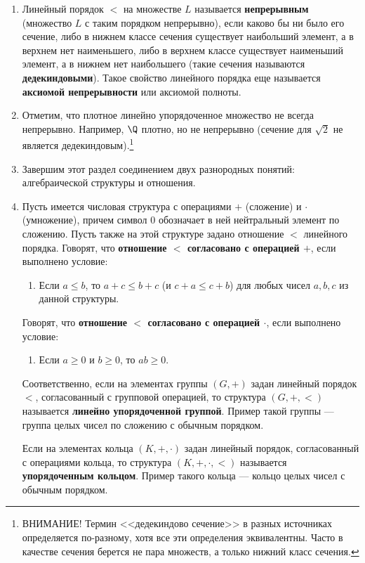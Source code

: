 \begin{enumerate}
\item Линейный порядок $<$ на множестве $L$ называется \textbf{непрерывным} (множество $L$ с таким порядком непрерывно), если каково бы ни было его сечение, либо в нижнем классе сечения существует наибольший элемент, а в верхнем нет наименьшего, либо в верхнем классе существует наименьший элемент, а в нижнем нет наибольшего (такие сечения называются \textbf{дедекиндовыми}). Такое свойство линейного порядка еще называется \textbf{аксиомой непрерывности} или аксиомой полноты.

\item Отметим, что плотное линейно упорядоченное множество не всегда непрерывно. Например, $\Q$ плотно, но не непрерывно (сечение для $\sqrt 2$ не является дедекиндовым).\footnote{ВНИМАНИЕ! Термин <<дедекиндово сечение>> в разных источниках определяется по-разному, хотя все эти определения эквивалентны. Часто в качестве сечения берется не пара множеств, а только нижний класс сечения.}

\item Завершим этот раздел соединением двух разнородных понятий: алгебраической структуры и отношения.
\item Пусть имеется числовая структура с операциями $+$ (сложение) и $\cdot$ (умножение), причем символ 0 обозначает в ней нейтральный элемент по сложению. Пусть также на этой структуре задано отношение $<$ линейного порядка. Говорят, что \textbf{отношение $<$ согласовано с операцией $+$}, если выполнено условие:
\begin{enumerate}[resume*]
\item Если $a\le b$, то $a+c\le b+c$ (и $c+a\le c+b$) для любых чисел $a,b,c$ из данной структуры.
\end{enumerate}
Говорят, что \textbf{отношение $<$ согласовано с операцией $\cdot$}, если выполнено условие:
\begin{enumerate}[resume*]
\item Если $a\ge 0$ и $b\ge 0$, то $ab\ge 0$.
\end{enumerate}

Соответственно, если на элементах группы $(G,+)$ задан линейный порядок $<$, согласованный с групповой операцией, то структура $(G,+,<)$ называется \textbf{линейно упорядоченной группой}. Пример такой группы --- группа целых чисел по сложению с обычным порядком.

Если на элементах кольца $(K,+,\cdot)$ задан линейный порядок, согласованный с операциями кольца, то структура $(K,+,\cdot,<)$ называется \textbf{упорядоченным кольцом}. Пример такого кольца --- кольцо целых чисел с обычным порядком.


\end{enumerate}
